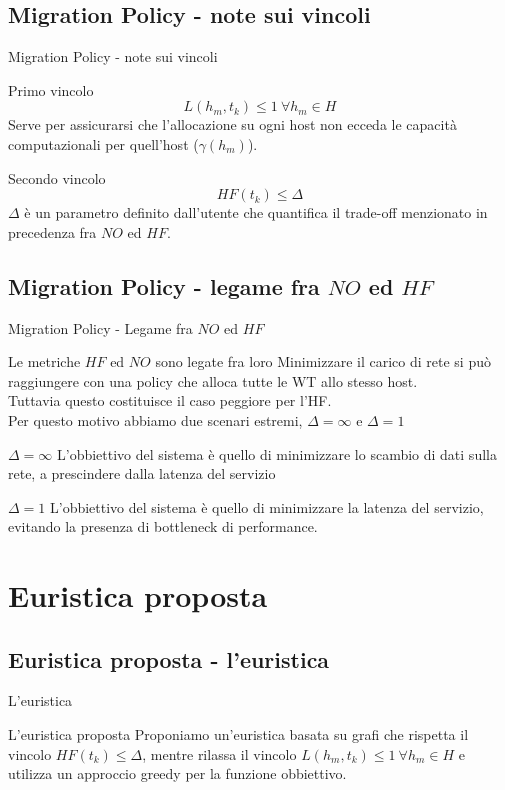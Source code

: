 \documentclass{beamer}
\begin{document}
\subsection{Migration Policy - note sui vincoli}
\begin{frame}{Migration Policy - note sui vincoli}
	\begin{block}{Primo vincolo}
		\[
		L(h_m, t_k) \le 1 \ \forall h_m \in H 
		\]
		Serve per assicurarsi che l'allocazione su ogni host non ecceda le capacità computazionali per quell'host ($\gamma(h_m)$).
	\end{block}
	\begin{block}{Secondo vincolo}
	\[
	HF(t_k) \le \Delta
	\]
	$\Delta$ è un parametro definito dall'utente che quantifica il trade-off menzionato in precedenza fra $NO$ ed $HF$.
	\end{block}
\end{frame}

\subsection{Migration Policy - legame fra $NO$ ed $HF$}
\begin{frame}{Migration Policy - Legame fra $NO$ ed $HF$}
	\begin{block}{Le metriche $HF$ ed $NO$ sono legate fra loro}
		Minimizzare il carico di rete si può raggiungere con una policy che alloca tutte le WT allo stesso host. \\
		Tuttavia questo costituisce il caso peggiore per l'HF. \\
		Per questo motivo abbiamo due scenari estremi, $\Delta = \infty$ e $\Delta = 1$
	\end{block}
	\begin{block}{$\Delta = \infty$}
		L'obbiettivo del sistema è quello di minimizzare lo scambio di dati sulla rete, a prescindere dalla latenza del servizio
	\end{block}
	\begin{block}{$\Delta = 1$}
	L'obbiettivo del sistema è quello di minimizzare la latenza del servizio, evitando la presenza di bottleneck di performance.
	\end{block}
\end{frame}


\section{Euristica proposta}
\subsection{Euristica proposta - l'euristica}
\begin{frame}{L'euristica}
	\begin{block}{L'euristica proposta}
		Proponiamo un'euristica basata su grafi che rispetta il vincolo $HF(t_k) \le \Delta$, mentre rilassa il vincolo  $L(h_m, t_k) \le 1 \ \forall h_m \in H$ e utilizza un approccio greedy per la funzione obbiettivo.
	\end{block}
\end{frame}
\end{document}

